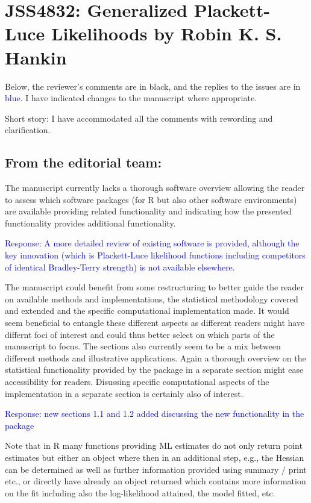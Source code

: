\documentclass[12pt]{article}
\begin{document}
\section*{JSS4832: Generalized Plackett-Luce Likelihoods by Robin
K. S. Hankin}


Below, the reviewer's comments are in black, and the replies to the
issues are in \textcolor{blue}{blue}.  I have indicated changes to
the manuscript where appropriate.

Short story: I have accommodated all the comments with rewording and
clarification.

\subsection*{From the editorial team:}

The manuscript currently lacks a thorough software overview allowing
the reader to assess which software packages (for R but also other
software environments) are available providing related functionality
and indicating how the presented functionality provides additional
functionality.

\textcolor{blue}{Response: A more detailed review of existing software
  is provided, although the key innovation (which is Plackett-Luce
  likelihood functions including competitors of identical
  Bradley-Terry strength) is not available elsewhere.}

The manuscript could benefit from some restructuring to better guide
the reader on available methods and implementations, the statistical
methodology covered and extended and the specific computational
implementation made.  It would seem beneficial to entangle these
different aspects as different readers might have differnt foci of
interest and could thus better select on which parts of the manuscript
to focus.  The sections also currently seem to be a mix between
different methods and illustrative applications. Again a thorough
overview on the statistical functionality provided by the package in a
separate section might ease accessibility for readers. Disussing
specific computational aspects of the implementation in a separate
section is certainly also of interest.

\textcolor{blue}{Response: new sections 1.1 and 1.2 added discussing
  the new functionality in the package}


Note that in R many functions providing ML estimates do not only
return point estimates but either an object where then in an
additional step, e.g., the Hessian can be determined as well as
further information provided using summary / print etc., or directly
have already an object returned which contains more information on the
fit including also the log-likelihood attained, the model fitted, etc.
\end{document}

